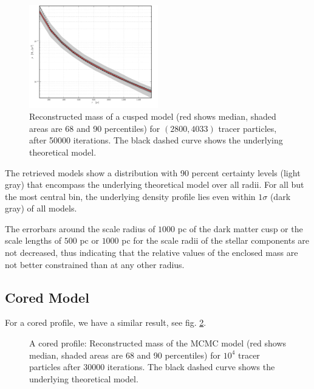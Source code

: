 \begin{figure}
\begin{center}
\hspace{-7mm}
\includegraphics[width=0.5\textwidth]{fig/20130718132442_case_2_10000_0_cprior_nulog_denslog_mslope_rprior_profdens.pdf}
\caption{Reconstructed mass of a cusped model (red shows median,
  shaded areas are 68 and 90 percentiles) for $(2800,4033)$ tracer particles,
  after 50000 iterations. The black dashed curve shows the underlying
  theoretical model.}
\label{fig:cusp}
\end{center}
\end{figure}

The retrieved models show a distribution with 90 percent certainty
levels (light gray) that encompass the underlying theoretical model
over all radii. For all but the most central bin, the underlying
density profile lies even within $1\sigma$ (dark gray) of all models.


The errorbars around the scale radius of $1000$ pc of the dark matter
cusp or the scale lengths of $500$ pc or $1000$ pc for the scale radii
of the stellar components are not decreased, thus indicating that the
relative values of the enclosed mass are not better constrained than
at any other radius.





\subsection{Cored Model}
For a cored profile, we have a similar result, see fig. \ref{fig:core}. 

\begin{figure}
\begin{center}
\hspace{-7mm}
\caption{A cored profile: Reconstructed mass of the MCMC model (red
  shows median, shaded areas are 68 and 90 percentiles) for $10^4$
  tracer particles after 30000 iterations. The black dashed curve
  shows the underlying theoretical model.}
\label{fig:core}
\end{center}
\end{figure}

